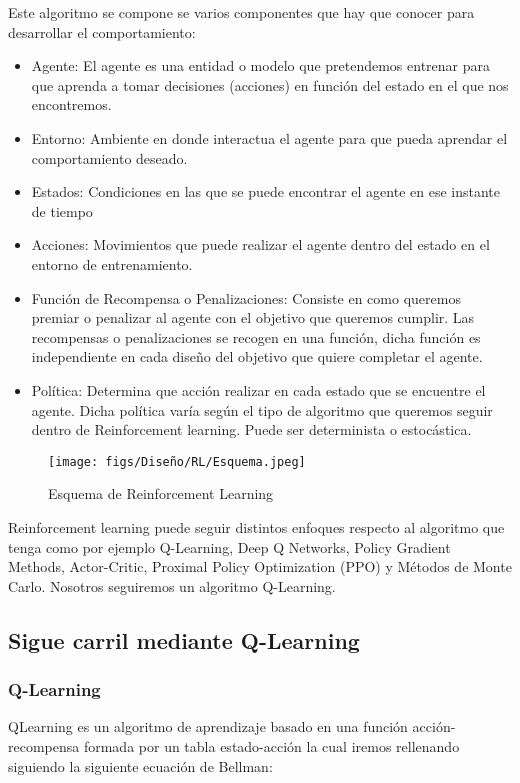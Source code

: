   Este algoritmo se compone se varios componentes que hay que conocer para desarrollar el comportamiento: 
  \begin{itemize} 
    \item Agente: El agente es una entidad o modelo que pretendemos entrenar para que aprenda a tomar decisiones (acciones) en función del estado en el que nos encontremos.
    \item Entorno: Ambiente en donde interactua el agente para que pueda aprendar el comportamiento deseado.
    \item Estados: Condiciones en las que se puede encontrar el agente en ese instante de tiempo
    \item Acciones: Movimientos que puede realizar el agente dentro del estado en el entorno de entrenamiento.
    \item Función de Recompensa o Penalizaciones: Consiste en como queremos premiar o penalizar al agente con el objetivo que queremos cumplir. Las recompensas o penalizaciones se recogen
    en una función, dicha función es independiente en cada diseño del objetivo que quiere completar el agente. 
    \item Política: Determina que acción realizar en cada estado que se encuentre el agente. Dicha política varía según el tipo de algoritmo que queremos seguir dentro de Reinforcement learning.
    Puede ser determinista o estocástica. 
  \end{itemize}

  \begin{figure} [H]
    \begin{center}
      \texttt{[image: figs/Diseño/RL/Esquema.jpeg]}
    \end{center}
    \caption{Esquema de Reinforcement Learning}
    \label{fig:esquemaRL}
  \end{figure}

  Reinforcement learning puede seguir distintos enfoques respecto al algoritmo que tenga como por ejemplo Q-Learning, Deep Q Networks, Policy Gradient Methods, Actor-Critic, 
  Proximal Policy Optimization (PPO) y Métodos de Monte Carlo. Nosotros seguiremos un algoritmo Q-Learning. 
  
  
  \subsection{Sigue carril mediante Q-Learning}
  \label{sec:QLearning}
  \subsubsection{Q-Learning}
  \label{sec:QLearning}
  QLearning es un algoritmo de aprendizaje basado en una función acción-recompensa formada por un tabla estado-acción la cual iremos rellenando siguiendo la siguiente ecuación 
  de Bellman: 


